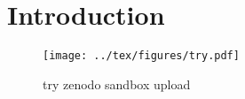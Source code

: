 \documentclass[twocolumn,twocolappendix,trackchanges]{aastex63}
\begin{document}
\section{Introduction}
\label{sec:intro}

\begin{figure}[ht!]
  \texttt{[image: ../tex/figures/try.pdf]}
  \caption{try zenodo sandbox upload}
  \label{fig:try}
\end{figure}




\end{document}
